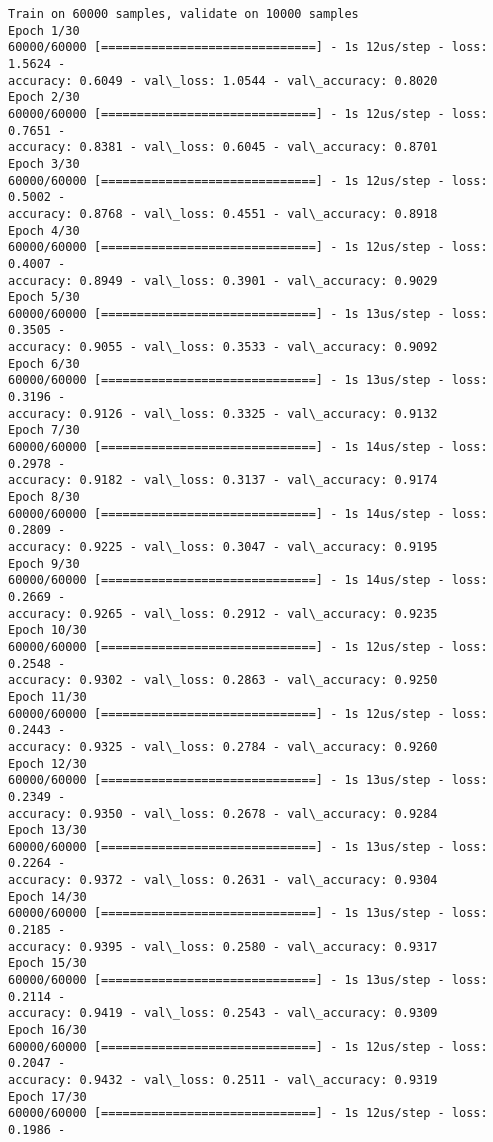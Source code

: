 \documentclass[11pt]{article}
\begin{document}
    \begin{Verbatim}[commandchars=\\\{\}]
Train on 60000 samples, validate on 10000 samples
Epoch 1/30
60000/60000 [==============================] - 1s 12us/step - loss: 1.5624 -
accuracy: 0.6049 - val\_loss: 1.0544 - val\_accuracy: 0.8020
Epoch 2/30
60000/60000 [==============================] - 1s 12us/step - loss: 0.7651 -
accuracy: 0.8381 - val\_loss: 0.6045 - val\_accuracy: 0.8701
Epoch 3/30
60000/60000 [==============================] - 1s 12us/step - loss: 0.5002 -
accuracy: 0.8768 - val\_loss: 0.4551 - val\_accuracy: 0.8918
Epoch 4/30
60000/60000 [==============================] - 1s 12us/step - loss: 0.4007 -
accuracy: 0.8949 - val\_loss: 0.3901 - val\_accuracy: 0.9029
Epoch 5/30
60000/60000 [==============================] - 1s 13us/step - loss: 0.3505 -
accuracy: 0.9055 - val\_loss: 0.3533 - val\_accuracy: 0.9092
Epoch 6/30
60000/60000 [==============================] - 1s 13us/step - loss: 0.3196 -
accuracy: 0.9126 - val\_loss: 0.3325 - val\_accuracy: 0.9132
Epoch 7/30
60000/60000 [==============================] - 1s 14us/step - loss: 0.2978 -
accuracy: 0.9182 - val\_loss: 0.3137 - val\_accuracy: 0.9174
Epoch 8/30
60000/60000 [==============================] - 1s 14us/step - loss: 0.2809 -
accuracy: 0.9225 - val\_loss: 0.3047 - val\_accuracy: 0.9195
Epoch 9/30
60000/60000 [==============================] - 1s 14us/step - loss: 0.2669 -
accuracy: 0.9265 - val\_loss: 0.2912 - val\_accuracy: 0.9235
Epoch 10/30
60000/60000 [==============================] - 1s 12us/step - loss: 0.2548 -
accuracy: 0.9302 - val\_loss: 0.2863 - val\_accuracy: 0.9250
Epoch 11/30
60000/60000 [==============================] - 1s 12us/step - loss: 0.2443 -
accuracy: 0.9325 - val\_loss: 0.2784 - val\_accuracy: 0.9260
Epoch 12/30
60000/60000 [==============================] - 1s 13us/step - loss: 0.2349 -
accuracy: 0.9350 - val\_loss: 0.2678 - val\_accuracy: 0.9284
Epoch 13/30
60000/60000 [==============================] - 1s 13us/step - loss: 0.2264 -
accuracy: 0.9372 - val\_loss: 0.2631 - val\_accuracy: 0.9304
Epoch 14/30
60000/60000 [==============================] - 1s 13us/step - loss: 0.2185 -
accuracy: 0.9395 - val\_loss: 0.2580 - val\_accuracy: 0.9317
Epoch 15/30
60000/60000 [==============================] - 1s 13us/step - loss: 0.2114 -
accuracy: 0.9419 - val\_loss: 0.2543 - val\_accuracy: 0.9309
Epoch 16/30
60000/60000 [==============================] - 1s 12us/step - loss: 0.2047 -
accuracy: 0.9432 - val\_loss: 0.2511 - val\_accuracy: 0.9319
Epoch 17/30
60000/60000 [==============================] - 1s 12us/step - loss: 0.1986 -

\end{Verbatim}
\end{document}

